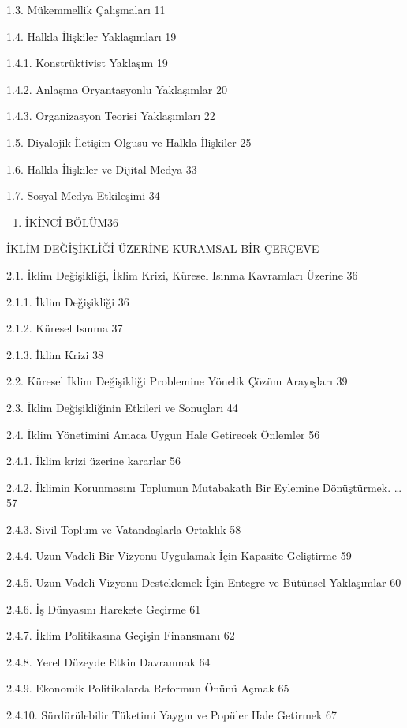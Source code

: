 \documentclass[
]{book}
\providecommand{\tightlist}{%
  \setlength{\itemsep}{0pt}\setlength{\parskip}{0pt}}
\begin{document}
1.3. Mükemmellik Çalışmaları 11

1.4. Halkla İlişkiler Yaklaşımları 19

1.4.1. Konstrüktivist Yaklaşım 19

1.4.2. Anlaşma Oryantasyonlu Yaklaşımlar 20

1.4.3. Organizasyon Teorisi Yaklaşımları 22

1.5. Diyalojik İletişim Olgusu ve Halkla İlişkiler 25

1.6. Halkla İlişkiler ve Dijital Medya 33

1.7. Sosyal Medya Etkileşimi 34

\begin{enumerate}
\def\labelenumi{\arabic{enumi}.}
\setcounter{enumi}{1}
\tightlist
\item
  İKİNCİ BÖLÜM36
\end{enumerate}

İKLİM DEĞİŞİKLİĞİ ÜZERİNE KURAMSAL BİR ÇERÇEVE

2.1. İklim Değişikliği, İklim Krizi, Küresel Isınma Kavramları Üzerine 36

2.1.1. İklim Değişikliği 36

2.1.2. Küresel Isınma 37

2.1.3. İklim Krizi 38

2.2. Küresel İklim Değişikliği Problemine Yönelik Çözüm Arayışları 39

2.3. İklim Değişikliğinin Etkileri ve Sonuçları 44

2.4. İklim Yönetimini Amaca Uygun Hale Getirecek Önlemler 56

2.4.1. İklim krizi üzerine kararlar 56

2.4.2. İklimin Korunmasını Toplumun Mutabakatlı Bir Eylemine Dönüştürmek. \ldots57

2.4.3. Sivil Toplum ve Vatandaşlarla Ortaklık 58

2.4.4. Uzun Vadeli Bir Vizyonu Uygulamak İçin Kapasite Geliştirme 59

2.4.5. Uzun Vadeli Vizyonu Desteklemek İçin Entegre ve Bütünsel Yaklaşımlar 60

2.4.6. İş Dünyasını Harekete Geçirme 61

2.4.7. İklim Politikasına Geçişin Finansmanı 62

2.4.8. Yerel Düzeyde Etkin Davranmak 64

2.4.9. Ekonomik Politikalarda Reformun Önünü Açmak 65

2.4.10. Sürdürülebilir Tüketimi Yaygın ve Popüler Hale Getirmek 67
\end{document}
